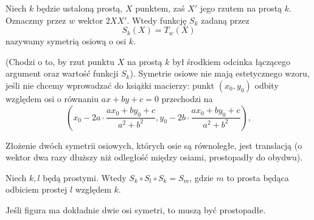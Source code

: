 
\begin{definition}
    Niech $k$ będzie ustaloną prostą, $X$ punktem, zaś $X'$ jego rzutem na prostą $k$.
    Oznaczmy przez $w$ wektor $2X X'$.
    Wtedy funkcję $S_k$ zadaną przez
    \begin{equation}
    S_k(X) = T_{w}(X)
    \end{equation}
    nazywamy symetrią osiową o osi $k$.
\end{definition}

(Chodzi o to, by rzut punktu $X$ na prostą $k$ był środkiem odcinka łączącego argument oraz wartość funkcji $S_k$).
Symetrie osiowe nie mają estetycznego wzoru, jeśli nie chcemy wprowadzać do książki macierzy: punkt $(x_0, y_0)$ odbity względem osi o równaniu $ax + by + c = 0$ przechodzi na
\begin{equation}
    \left(
    x_0 - 2a \cdot \frac{ax_0 + by_0 + c}{a^2 + b^2},
    y_0 - 2b \cdot \frac{ax_0 + by_0 + c}{a^2 + b^2}
    \right),
\end{equation}

\begin{proposition}
\label{kordos_banach_6}%
    Złożenie dwóch symetrii osiowych, których osie są równoległe, jest translacją (o wektor dwa razy dłuższy niż odległość między osiami, prostopadły do obydwu).
\end{proposition}

\begin{proposition}
\label{klkm1}%
    Niech $k, l$ będą prostymi.
    Wtedy $S_k \circ S_l \circ S_k = S_m$, gdzie $m$ to prosta będąca odbiciem prostej $l$ względem $k$.
\end{proposition}

Jeśli figura ma dokładnie dwie osi symetri, to muszą być prostopadłe.
